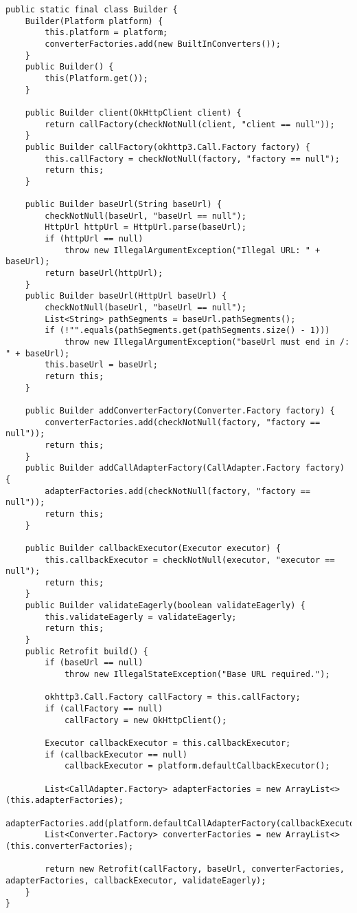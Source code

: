 \documentclass[9pt, b5paper]{article}
\begin{document}
\begin{verbatim}
public static final class Builder {
    Builder(Platform platform) {
        this.platform = platform;
        converterFactories.add(new BuiltInConverters());
    }
    public Builder() {
        this(Platform.get());
    }

    public Builder client(OkHttpClient client) {
        return callFactory(checkNotNull(client, "client == null"));
    }
    public Builder callFactory(okhttp3.Call.Factory factory) {
        this.callFactory = checkNotNull(factory, "factory == null");
        return this;
    }

    public Builder baseUrl(String baseUrl) {
        checkNotNull(baseUrl, "baseUrl == null");
        HttpUrl httpUrl = HttpUrl.parse(baseUrl);
        if (httpUrl == null) 
            throw new IllegalArgumentException("Illegal URL: " + baseUrl);
        return baseUrl(httpUrl);
    }
    public Builder baseUrl(HttpUrl baseUrl) {
        checkNotNull(baseUrl, "baseUrl == null");
        List<String> pathSegments = baseUrl.pathSegments();
        if (!"".equals(pathSegments.get(pathSegments.size() - 1))) 
            throw new IllegalArgumentException("baseUrl must end in /: " + baseUrl);
        this.baseUrl = baseUrl;
        return this;
    }

    public Builder addConverterFactory(Converter.Factory factory) {
        converterFactories.add(checkNotNull(factory, "factory == null"));
        return this;
    }
    public Builder addCallAdapterFactory(CallAdapter.Factory factory) {
        adapterFactories.add(checkNotNull(factory, "factory == null"));
        return this;
    }

    public Builder callbackExecutor(Executor executor) {
        this.callbackExecutor = checkNotNull(executor, "executor == null");
        return this;
    }
    public Builder validateEagerly(boolean validateEagerly) {
        this.validateEagerly = validateEagerly;
        return this;
    }
    public Retrofit build() {
        if (baseUrl == null) 
            throw new IllegalStateException("Base URL required.");

        okhttp3.Call.Factory callFactory = this.callFactory;
        if (callFactory == null) 
            callFactory = new OkHttpClient();

        Executor callbackExecutor = this.callbackExecutor;
        if (callbackExecutor == null) 
            callbackExecutor = platform.defaultCallbackExecutor();

        List<CallAdapter.Factory> adapterFactories = new ArrayList<>(this.adapterFactories);
        adapterFactories.add(platform.defaultCallAdapterFactory(callbackExecutor));
        List<Converter.Factory> converterFactories = new ArrayList<>(this.converterFactories);

        return new Retrofit(callFactory, baseUrl, converterFactories, adapterFactories, callbackExecutor, validateEagerly);
    }
}
\end{verbatim}
\end{document}
